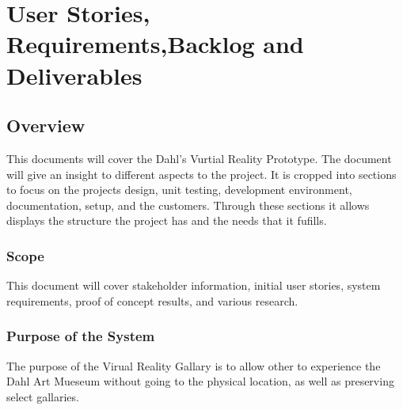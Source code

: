 \chapter{User Stories,  Requirements,Backlog and Deliverables}
\section{Overview}


This documents  will cover the Dahl's Vurtial Reality Prototype. The document will give an insight to different aspects to the project. It is cropped into sections to focus on the projects design, unit testing, development environment, documentation, setup, and the customers. Through these sections it allows displays the structure the project has and the needs that it fufills.






\subsection{Scope}


This document will cover stakeholder information, 
initial user stories, system requirements, proof of concept results, 
and various research. 



\subsection{Purpose of the System}
The purpose of the Virual Reality Gallary is to allow other to experience the Dahl Art
Mueseum without going to the physical location, as well as preserving select gallaries.  


